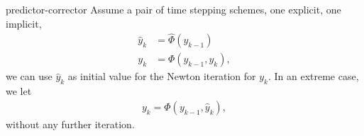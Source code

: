 \begin{Definition}{predictor-corrector}
  Assume a pair of time stepping schemes, one explicit, one implicit,
  \begin{align*}
    \hat y_{k} &= \hat \Phi(y_{k-1}) \\
    y_k &= \Phi(y_{k-1},y_{k}),
  \end{align*}
  we can use $\hat y_k$ as initial value for the Newton iteration for
  $y_k$. In an extreme case, we let
  \begin{gather*}
    y_k = \Phi(y_{k-1},\hat y_{k}),
  \end{gather*}
  without any further iteration.
\end{Definition}

